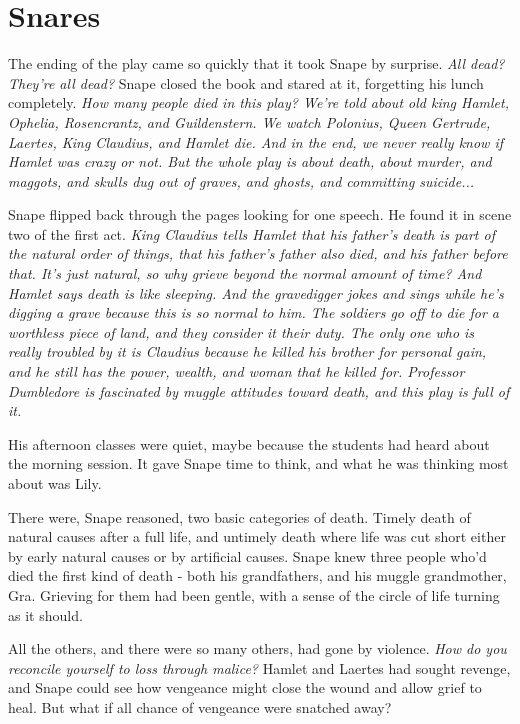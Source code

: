 
\chapter{Snares}

The ending of the play came so quickly that it took Snape by surprise. \emph{All dead? They're all dead?} Snape closed the book and stared at it, forgetting his lunch completely. \emph{How many people died in this play? We're told about old king Hamlet, Ophelia, Rosencrantz, and Guildenstern. We watch Polonius, Queen Gertrude, Laertes, King Claudius, and Hamlet die. And in the end, we never really know if Hamlet was crazy or not. But the whole play is about death, about murder, and maggots, and skulls dug out of graves, and ghosts, and committing suicide...}

Snape flipped back through the pages looking for one speech. He found it in scene two of the first act. \emph{King Claudius tells Hamlet that his father's death is part of the natural order of things, that his father's father also died, and his father before that. It's just natural, so why grieve beyond the normal amount of time? And Hamlet says death is like sleeping. And the gravedigger jokes and sings while he's digging a grave because this is so normal to him. The soldiers go off to die for a worthless piece of land, and they consider it their duty. The only one who is really troubled by it is Claudius because he killed his brother for personal gain, and he still has the power, wealth, and woman that he killed for. Professor Dumbledore is fascinated by muggle attitudes toward death, and this play is full of it.}

His afternoon classes were quiet, maybe because the students had heard about the morning session. It gave Snape time to think, and what he was thinking most about was Lily.

There were, Snape reasoned, two basic categories of death. Timely death of natural causes after a full life, and untimely death where life was cut short either by early natural causes or by artificial causes. Snape knew three people who'd died the first kind of death - both his grandfathers, and his muggle grandmother, Gra. Grieving for them had been gentle, with a sense of the circle of life turning as it should.

All the others, and there were so many others, had gone by violence. \emph{How do you reconcile yourself to loss through malice?} Hamlet and Laertes had sought revenge, and Snape could see how vengeance might close the wound and allow grief to heal. But what if all chance of vengeance were snatched away?

